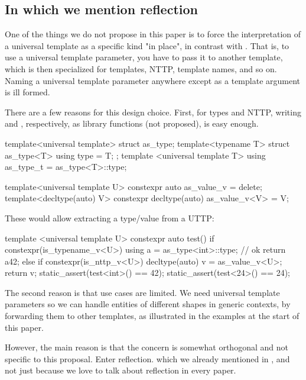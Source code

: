 \documentclass{wg21}
\begin{document}
\subsection{In which we mention reflection}

One of the things we do not propose in this paper is to force the interpretation of a universal template as a specific kind "in place", in contrast with .
That is, to use a universal template parameter, you have to pass it to another template, which is then specialized for templates, NTTP, template names, and so on.
Naming a universal template parameter anywhere except as a template argument is ill formed.

There are a few reasons for this design choice.
First, for types and NTTP, writing  and , respectively, as library functions (not proposed), is easy enough.

\begin{colorblock}
template<universal template>
struct as_type;
template<typename T>
struct as_type<T> { using type = T; };
template <universal template T>
using as_type_t = as_type<T>::type;

template<universal template U>
constexpr auto as_value_v = delete;
template<decltype(auto) V>
constexpr decltype(auto) as_value_v<V> = V;
\end{colorblock}

These would allow extracting a type/value from a UTTP:

\begin{colorblock}
template <universal template U>
constexpr auto test() {
    if constexpr(is_typename_v<U>) {
        using a =  as_type<int>::type; // ok
        return a{42};
    }
    else if constexpr(is_nttp_v<U>) {
        decltype(auto) v = as_value_v<U>;
        return v;
    }
}
static_assert(test<int>() == 42);
static_assert(test<24>() == 24);
\end{colorblock}

The second reason is that use cases are limited.
We need universal template parameters so we can handle entities of different shapes in generic contexts, by forwarding them to other templates, as illustrated in the examples at the start of this paper.

However, the main reason is that the concern is somewhat orthogonal and not specific to this proposal.
Enter reflection. which we already mentioned in , and not just because we love to talk about reflection in every paper.
\end{document}

